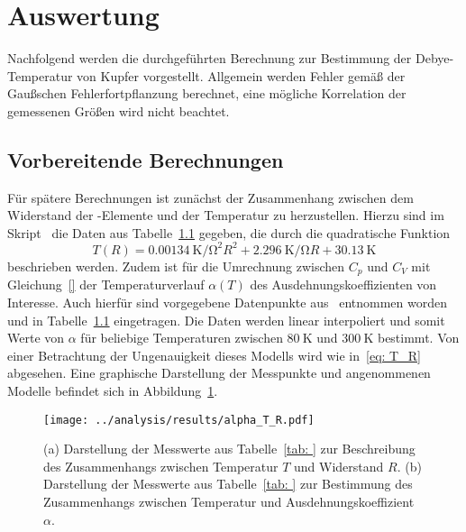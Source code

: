 \section{Auswertung}
Nachfolgend werden die durchgeführten Berechnung zur Bestimmung der Debye-Temperatur von Kupfer 
vorgestellt. Allgemein werden Fehler gemäß der Gaußschen Fehlerfortpflanzung berechnet, eine mögliche 
Korrelation der gemessenen Größen wird nicht beachtet.

\subsection{Vorbereitende Berechnungen}
Für spätere Berechnungen ist zunächst der Zusammenhang zwischen dem Widerstand der -Elemente und der Temperatur 
zu herzustellen. Hierzu sind im Skript~\cite{anleitung47} die Daten aus Tabelle~\ref{} gegeben, die durch die quadratische 
Funktion
\begin{equation}
    T(R) = \SI{0.00134}{\kelvin \per \ohm\squared} R^2 + \SI{2.296}{\kelvin \per \ohm} R + \SI{30.13}{\kelvin}
    \label{eq: T_R}
\end{equation}
beschrieben werden. Zudem ist für die Umrechnung zwischen $C_p$ und $C_V$ mit Gleichung~\eqref{} der Temperaturverlauf 
$\alpha(T)$ des Ausdehnungskoeffizienten von Interesse. Auch hierfür sind vorgegebene Datenpunkte aus~\cite{} entnommen 
worden und in Tabelle~\ref{} eingetragen. Die Daten werden linear interpoliert und somit Werte von $\alpha$ für 
beliebige Temperaturen zwischen $\SI{80}{\kelvin}$ und $\SI{300}{\kelvin}$ bestimmt. Von einer Betrachtung der Ungenauigkeit 
dieses Modells wird wie in~\eqref{eq: T_R} abgesehen. Eine graphische Darstellung der Messpunkte und angenommenen 
Modelle befindet sich in Abbildung~\ref{fig: alpha_T_R}.
\begin{figure}
\centering
\texttt{[image: ../analysis/results/alpha\_T\_R.pdf]}
\caption{(a) Darstellung der Messwerte aus Tabelle~\ref{tab: } zur Beschreibung des Zusammenhangs zwischen Temperatur 
        $T$ und Widerstand $R$.
        (b) Darstellung der Messwerte aus Tabelle~\ref{tab: } zur Bestimmung des Zusammenhangs zwischen Temperatur und
         Ausdehnungskoeffizient $\alpha$.}
\label{fig: alpha_T_R}
\end{figure}


